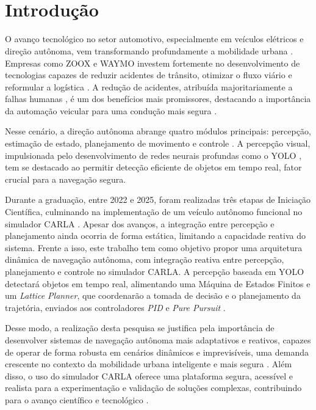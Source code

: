 \documentclass[
	12pt,				%
	oneside, %
	a4paper,			%
	english,			%
	french,				%
	spanish,			%
	brazil				%
	]{abntex2}
\def\maketitle{
    \begin{center}
        \LARGE \textbf{\thetitle} \\[1em]
        \large {\theauthor}\\ [0.5em]
        \small \thedate
    \end{center}
}
\begin{document}
\maketitle

\section{Introdução}

O avanço tecnológico no setor automotivo, especialmente em veículos elétricos e direção autônoma, vem transformando profundamente a mobilidade urbana \cite{sebo2024impact}. Empresas como ZOOX\textsuperscript{\textregistered} e WAYMO\textsuperscript{\textregistered} investem fortemente no desenvolvimento de tecnologias capazes de reduzir acidentes de trânsito, otimizar o fluxo viário e reformular a logística \cite{Center_of_Automotive_Management2022}. A redução de acidentes, atribuída majoritariamente a falhas humanas \cite{nhtsa_crash_causation}, é um dos benefícios mais promissores, destacando a importância da automação veicular para uma condução mais segura \cite{okpono2024advanced}.

Nesse cenário, a direção autônoma abrange quatro módulos principais: percepção, estimação de estado, planejamento de movimento e controle \cite{reinholtz2007darpa, paden2016survey}. A percepção visual, impulsionada pelo desenvolvimento de redes neurais profundas como o YOLO \cite{redmon2016lookonceunifiedrealtime, wang_yolov1_to_yolov10}, tem se destacado ao permitir detecção eficiente de objetos em tempo real, fator crucial para a navegação segura.

Durante a graduação, entre 2022 e 2025, foram realizadas três etapas de Iniciação Científica, culminando na implementação de um veículo autônomo funcional no simulador CARLA \cite{gomes2025relatorio, dosovitskiy2017carla}. Apesar dos avanços, a integração entre percepção e planejamento ainda ocorria de forma estática, limitando a capacidade reativa do sistema. Frente a isso, este trabalho tem como objetivo propor uma arquitetura dinâmica de navegação autônoma, com integração reativa entre percepção, planejamento e controle no simulador CARLA. A percepção baseada em YOLO detectará objetos em tempo real, alimentando uma Máquina de Estados Finitos e um \textit{Lattice Planner}, que coordenarão a tomada de decisão e o planejamento da trajetória, enviados aos controladores \textit{PID} e \textit{Pure Pursuit} \cite{University_of_Toronto2018-fe}.

Desse modo, a realização desta pesquisa se justifica pela importância de desenvolver sistemas de navegação autônoma mais adaptativos e reativos, capazes de operar de forma robusta em cenários dinâmicos e imprevisíveis, uma demanda crescente no contexto da mobilidade urbana inteligente e mais segura \cite{sebo2024impact}. Além disso, o uso do simulador CARLA oferece uma plataforma segura, acessível e realista para a experimentação e validação de soluções complexas, contribuindo para o avanço científico e tecnológico \cite{dosovitskiy2017carla}.
\end{document}
